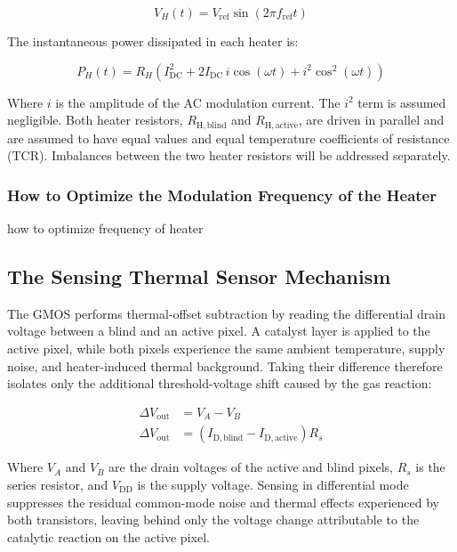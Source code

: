 \begin{equation}
  V_H(t) = V_{\mathrm{ref}}\sin\left(2\pi f_{\mathrm{ref}} t\right)
  \label{eq:heater_voltage}
\end{equation}

The instantaneous power dissipated in each heater is:

\begin{equation}
  P_H(t) = R_H \left(I_{\mathrm{DC}}^2 + 2I_{\mathrm{DC}}\,i\cos(\omega t)
            + i^2\cos^2(\omega t)\right)
  \label{eq:heater_power}
\end{equation}

Where $i$ is the amplitude of the AC modulation current. The $i^2$ term is assumed
negligible. Both heater resistors, $R_{\mathrm{H,blind}}$ and $R_{\mathrm{H,active}}$,
are driven in parallel and are assumed to have equal values and equal temperature
coefficients of resistance (TCR). Imbalances between the two heater resistors will be
addressed separately.


\subsubsection{How to Optimize the Modulation Frequency of the Heater}
how to optimize frequency of heater

\subsection{The Sensing Thermal Sensor Mechanism}
The GMOS performs thermal-offset subtraction by reading the differential drain
voltage between a blind and an active pixel. A catalyst layer is applied to the
active pixel, while both pixels experience the same ambient temperature, supply
noise, and heater-induced thermal background. Taking their difference therefore
isolates only the additional threshold-voltage shift caused by the gas
reaction:

\begin{align}
  \Delta V_{\mathrm{out}} &= V_A - V_B
                              \label{eq:diff_voltage_def}\\
  \Delta V_{\mathrm{out}} &= \left(I_{\mathrm{D,blind}} - I_{\mathrm{D,active}}\right) R_s
                              \label{eq:diff_voltage}
\end{align}

Where $V_A$ and $V_B$ are the drain voltages of the active and blind pixels,
$R_s$ is the series resistor, and $V_{\mathrm{DD}}$ is the supply voltage.
Sensing in differential mode suppresses the residual common-mode noise and
thermal effects experienced by both transistors, leaving behind only the
voltage change attributable to the catalytic reaction on the active pixel.

